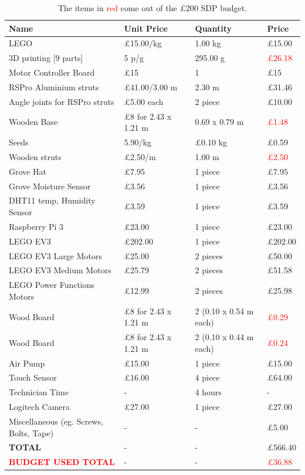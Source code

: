 \documentclass{article}
\begin{document}
\begin{table}[h]
{\begin{tabular}{ |p{2.8cm}|p{1.6cm}|p{1cm}|p{0.9cm}|  }
\hline
\textbf{Name}& \textbf{Unit Price} &\textbf{Quantity} & \textbf{Price} \\
\hline
LEGO & £15.00/kg &1.00 kg &£15.00 \\
\hline
3D printing [9 parts] & 5 p/g   & 295.00 g & \textcolor{red}{£26.18}\\
\hline
Motor Controller Board & £15 & 1 & £15 \\
\hline 
RSPro Aluminium struts &£41.00/3.00 m & 2.30 m & £31.46 \\
\hline
Angle joints for RSPro struts    &£5.00 each & 2 piece & £10.00 \\
\hline
Wooden Base & £8 for 2.43 x 1.21 m & 0.69 x 0.79 m & \textcolor{red}{£1.48}\\
\hline
Seeds & 5.90/kg & £0.10 kg &£0.59   \\
\hline
Wooden struts & £2.50/m & 1.00 m & \textcolor{red}{£2.50} \\
\hline
Grove Hat & £7.95& 1 piece & £7.95 \\
\hline
Grove Moisture Sensor & £3.56 & 1 piece&£3.56 \\
\hline
DHT11 temp, Humidity Sensor & £3.59 & 1 piece& £3.59 \\
\hline
Raspberry Pi 3 & £23.00 & 1 piece& £23.00 \\
\hline
LEGO EV3 & £202.00 & 1 piece& £202.00 \\
\hline
LEGO EV3 Large Motors & £25.00 & 2 pieces& £50.00 \\
\hline
LEGO EV3 Medium Motors & £25.79 & 2 pieces& £51.58\\
\hline
LEGO Power Functions Motors & £12.99 & 2 pieces& £25.98\\
\hline
Wood Board  & £8 for 2.43 x 1.21 m & 2 (0.10 x 0.54 m each) & \textcolor{red}{£0.29}\\
\hline
Wood Board & £8 for 2.43 x 1.21 m & 2 (0.10 x 0.44 m each) & \textcolor{red}{£0.24} \\
\hline
Air Pump & £15.00 & 1 piece& £15.00 \\
\hline
Touch Sensor & £16.00 &4 piece& £64.00 \\
\hline
Technician Time & - &4 hours & - \\
\hline
Logitech Camera &£27.00  &1 piece& £27.00 \\
\hline
Miscellaneous (eg. Screws, Bolts, Tape) & - & - & £5.00 \\
\hline
\textbf{TOTAL}  & - & - & £566.40 \\
\hline
\textcolor{red}{\textbf{BUDGET USED TOTAL}}  & - & - & \textcolor{red}{£36.88}\\
\hline 
\end{tabular}
}
\caption{The items in \textcolor{red}{red} come out of the £200 SDP budget.}
\end{table}
\vspace{-2mm}
\end{document}
